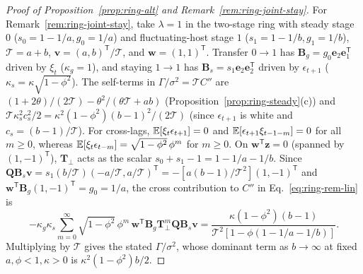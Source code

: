 \begin{proof}[Proof of Proposition~{\upshape\ref{prop:ring-alt}} and Remark~{\upshape\ref{rem:ring-joint-stay}}]
For Remark~\ref{rem:ring-joint-stay}, take $\lambda = 1$ in the two-stage ring with steady stage $0$ ($s_0 = 1 - 1/a, g_0 = 1/a$) and fluctuating-host stage $1$ ($s_1 = 1 - 1/b, g_1 = 1/b$), $\mathcal{T} = a + b$, $\mathbf{v} = (a, b)^{\mathsf{T}}/\mathcal{T}$, and $\mathbf{w} = (1, 1)^{\mathsf{T}}$. Transfer $0 \to 1$ has $\mathbf{B}_g = g_0\mathbf{e}_2\mathbf{e}_1^{\mathsf{T}}$ driven by $\xi_t$ ($\kappa_g = 1$), and staying $1 \to 1$ has $\mathbf{B}_s = s_1\mathbf{e}_2\mathbf{e}_2^{\mathsf{T}}$ driven by $\epsilon_{t+1}$ ($\kappa_s = \kappa\sqrt{1 - \phi^2}$). The self-terms in $\Gamma/\sigma^2 = \mathcal{T}C''$ are $(1 + 2\theta)/(2\mathcal{T}) - \theta^2/(\theta\mathcal{T} + ab)$ (Proposition~\ref{prop:ring-steady}(c)) and $\mathcal{T}\kappa_s^2 c_s^2/2 = \kappa^2(1 - \phi^2)(b - 1)^2/(2\mathcal{T})$ (since $\epsilon_{t+1}$ is white and $c_s = (b - 1)/\mathcal{T}$). For cross-lags, $\mathbb{E}[\xi_t\epsilon_{t+1}] = 0$ and $\mathbb{E}[\epsilon_{t+1}\xi_{t-1-m}] = 0$ for all $m \ge 0$, whereas $\mathbb{E}[\xi_t\epsilon_{t-m}] = \sqrt{1 - \phi^2}\,\phi^m$ for $m \ge 0$. On $\mathbf{w}^{\mathsf{T}}\mathbf{z} = 0$ (spanned by $(1, -1)^{\mathsf{T}}$), $\mathbf{T}_\perp$ acts as the scalar $s_0 + s_1 - 1 = 1 - 1/a - 1/b$. Since $\mathbf{Q}\mathbf{B}_s\mathbf{v} = s_1(b/\mathcal{T})(-a/\mathcal{T}, a/\mathcal{T})^{\mathsf{T}} = -[a(b - 1)/\mathcal{T}^2](1, -1)^{\mathsf{T}}$ and $\mathbf{w}^{\mathsf{T}}\mathbf{B}_g(1, -1)^{\mathsf{T}} = g_0 = 1/a$, the cross contribution to $C''$ in Eq.~\eqref{eq:ring-rem-lin} is
\[
-\kappa_g\kappa_s \sum_{m=0}^{\infty} \sqrt{1 - \phi^2}\,\phi^m\,\mathbf{w}^{\mathsf{T}}\mathbf{B}_g\mathbf{T}_\perp^m\mathbf{Q}\mathbf{B}_s\mathbf{v} = \frac{\kappa(1 - \phi^2)(b - 1)}{\mathcal{T}^2[1 - \phi(1 - 1/a - 1/b)]}.
\]
Multiplying by $\mathcal{T}$ gives the stated $\Gamma/\sigma^2$, whose dominant term as $b \to \infty$ at fixed $a, \phi < 1, \kappa > 0$ is $\kappa^2(1 - \phi^2)b/2$.
\end{proof}

